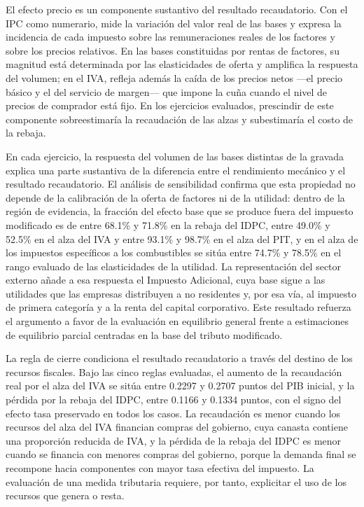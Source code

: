 \documentclass[11pt]{article}
\begin{document}
El efecto precio es un componente sustantivo del resultado recaudatorio. Con el IPC como numerario, mide la variación del valor real de las bases y expresa la incidencia de cada impuesto sobre las remuneraciones reales de los factores y sobre los precios relativos. En las bases constituidas por rentas de factores, su magnitud está determinada por las elasticidades de oferta y amplifica la respuesta del volumen; en el IVA, refleja además la caída de los precios netos ---el precio básico y el del servicio de margen--- que impone la cuña cuando el nivel de precios de comprador está fijo. En los ejercicios evaluados, prescindir de este componente sobreestimaría la recaudación de las alzas y subestimaría el costo de la rebaja.

En cada ejercicio, la respuesta del volumen de las bases distintas de la gravada explica una parte sustantiva de la diferencia entre el rendimiento mecánico y el resultado recaudatorio. El análisis de sensibilidad confirma que esta propiedad no depende de la calibración de la oferta de factores ni de la utilidad: dentro de la región de evidencia, la fracción del efecto base que se produce fuera del impuesto modificado es de entre 68.1\% y 71.8\% en la rebaja del IDPC, entre 49.0\% y 52.5\% en el alza del IVA y entre 93.1\% y 98.7\% en el alza del PIT, y en el alza de los impuestos específicos a los combustibles se sitúa entre 74.7\% y 78.5\% en el rango evaluado de las elasticidades de la utilidad. La representación del sector externo añade a esa respuesta el Impuesto Adicional, cuya base sigue a las utilidades que las empresas distribuyen a no residentes y, por esa vía, al impuesto de primera categoría y a la renta del capital corporativo. Este resultado refuerza el argumento a favor de la evaluación en equilibrio general frente a estimaciones de equilibrio parcial centradas en la base del tributo modificado.

La regla de cierre condiciona el resultado recaudatorio a través del destino de los recursos fiscales. Bajo las cinco reglas evaluadas, el aumento de la recaudación real por el alza del IVA se sitúa entre 0.2297 y 0.2707 puntos del PIB inicial, y la pérdida por la rebaja del IDPC, entre 0.1166 y 0.1334 puntos, con el signo del efecto tasa preservado en todos los casos. La recaudación es menor cuando los recursos del alza del IVA financian compras del gobierno, cuya canasta contiene una proporción reducida de IVA, y la pérdida de la rebaja del IDPC es menor cuando se financia con menores compras del gobierno, porque la demanda final se recompone hacia componentes con mayor tasa efectiva del impuesto. La evaluación de una medida tributaria requiere, por tanto, explicitar el uso de los recursos que genera o resta.
\end{document}
